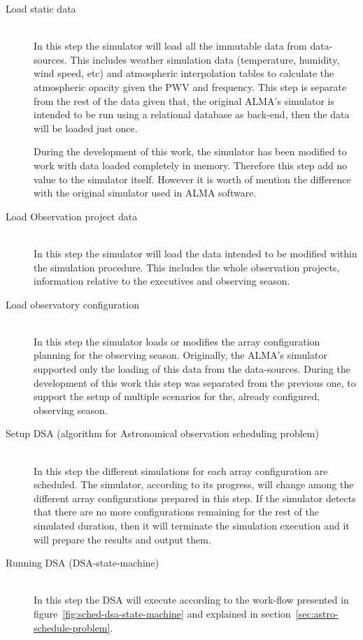 \begin{description}
\item[Load static data] \hfill \\
In this step the simulator will load all the immutable data from data-sources. This includes weather simulation data (temperature, humidity, wind speed, etc) and atmospheric interpolation tables to calculate the atmospheric opacity given the PWV and frequency. This step is separate from the rest of the data given that, the original ALMA's simulator is intended to be run using a relational database as back-end, then the data will be loaded just once.

During the development of this work, the simulator has been modified to work with data loaded completely in memory. Therefore this step add no value to the simulator itself. However it is worth of mention the difference with the original simulator used in ALMA software. 

\item[Load Observation project data] \hfill \\
In this step the simulator will load the data intended to be modified within the simulation procedure. This includes the whole observation projects, information relative to the executives and observing season.

\item[Load observatory configuration] \hfill \\
In this step the simulator loads or modifies the array configuration planning for the observing season. Originally, the ALMA's simulator supported only the loading of this data from the data-sources. During the development of this work this step was separated from the previous one, to support the setup of multiple scenarios for the, already configured, observing season.

\item[Setup DSA (algorithm for Astronomical observation scheduling problem)] \hfill \\
In this step the different simulations for each array configuration are scheduled. The simulator, according to its progress, will change among the different array configurations prepared in this step. If the simulator detects that there are no more configurations remaining for the rest of the simulated duration, then it will terminate the simulation execution and it will prepare the results and output them.

\item[Running DSA (DSA-state-machine)] \hfill \\
In this step the DSA will execute according to the work-flow presented in figure~\ref{fig:sched-dsa-state-machine} and explained in section~\ref{sec:astro-schedule-problem}.


\end{description}
